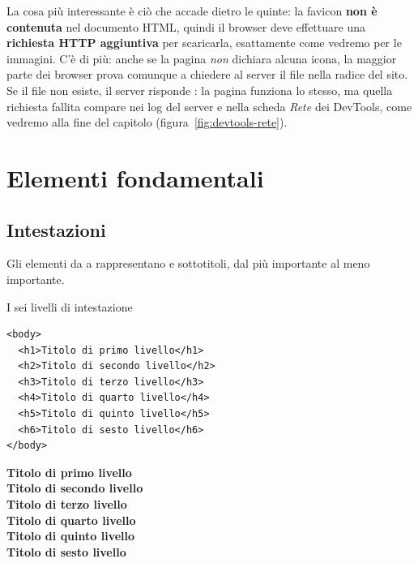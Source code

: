 La cosa più interessante è ciò che accade dietro le quinte: la favicon
\textbf{non è contenuta} nel documento HTML, quindi il browser deve effettuare
una \textbf{richiesta HTTP aggiuntiva} per scaricarla, esattamente come vedremo
per le immagini. C'è di più: anche se la pagina \textit{non} dichiara alcuna
icona, la maggior parte dei browser prova comunque a chiedere al server il file
 nella radice del sito. Se il file non esiste, il server
risponde : la pagina funziona lo stesso, ma quella richiesta
fallita compare nei log del server e nella scheda \textit{Rete} dei DevTools,
come vedremo alla fine del capitolo (figura~\ref{fig:devtools-rete}).


\section{Elementi fondamentali}

\subsection{Intestazioni}

Gli elementi da  a  rappresentano  e
sottotitoli, dal più importante al meno importante.

\begin{esempio}{I sei livelli di intestazione}
\begin{affianco}[0.46]
\begin{lstlisting}[style=html, name=headings.html]
<body>
  <h1>Titolo di primo livello</h1>
  <h2>Titolo di secondo livello</h2>
  <h3>Titolo di terzo livello</h3>
  <h4>Titolo di quarto livello</h4>
  <h5>Titolo di quinto livello</h5>
  <h6>Titolo di sesto livello</h6>
</body>
\end{lstlisting}
\risultato
\begin{browser}
  {\Lora\bfseries\Huge Titolo di primo livello}\\[5pt]
  {\Lora\bfseries\LARGE Titolo di secondo livello}\\[5pt]
  {\Lora\bfseries\large Titolo di terzo livello}\\[5pt]
  {\Lora\bfseries\normalsize Titolo di quarto livello}\\[5pt]
  {\Lora\bfseries\small Titolo di quinto livello}\\[5pt]
  {\Lora\bfseries\footnotesize Titolo di sesto livello}
\end{browser}
\end{affianco}
\end{esempio}


